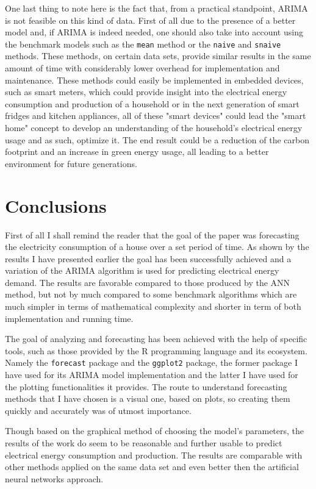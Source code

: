 \documentclass[12pt,a4paper,titlepage]{report}
\begin{document}
One last thing to note here is the fact that, from a practical standpoint, ARIMA is not feasible on this kind of data. First of all due to the presence of a better model and, if ARIMA is indeed needed, one should also take into account using the benchmark models such as the \texttt{mean} method or the \texttt{naive} and \texttt{snaive} methods. These methods, on certain data sets, provide similar results in the same amount of time with considerably lower overhead for implementation and maintenance. These methods could easily be implemented in embedded devices, such as smart meters, which could provide insight into the electrical energy consumption and production of a household or in the next generation of smart fridges and kitchen appliances, all of these "smart devices" could lead the "smart home" concept to develop an understanding of the household's electrical energy usage and as such, optimize it. The end result could be a reduction of the carbon footprint and an increase in green energy usage, all leading to a better environment for future generations.

\section{Conclusions}
First of all I shall remind the reader that the goal of the paper was forecasting the electricity consumption of a house over a set period of time. As shown by the results I have presented earlier the goal has been successfully achieved and a variation of the ARIMA algorithm is used for predicting electrical energy demand. The results are favorable compared to those produced by the ANN method, but not by much compared to some benchmark algorithms which are much simpler in terms of mathematical complexity and shorter in term of both implementation and running time.

The goal of analyzing and forecasting has been achieved with the help of specific tools, such as those provided by the R programming language and its ecosystem. Namely the \texttt{forecast} package and the \texttt{ggplot2} package, the former package I have used for its ARIMA model implementation and the latter I have used for the plotting functionalities it provides. The route to understand forecasting methods that I have chosen is a visual one, based on plots, so creating them quickly and accurately was of utmost importance.

Though based on the graphical method of choosing the model's parameters, the results of the work do seem to be reasonable and further usable to predict electrical energy consumption and production. The results are comparable with other methods applied on the same data set and even better then the artificial neural networks approach.
\end{document}
